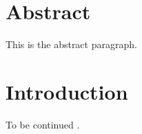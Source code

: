 \documentclass[12pt]{trbart}
\begin{document}
\linenumbers%
\maketitle

\section{Abstract}
This is the abstract paragraph.



\section{Introduction}
To be continued .


\printtrbrefs%
\end{document}

